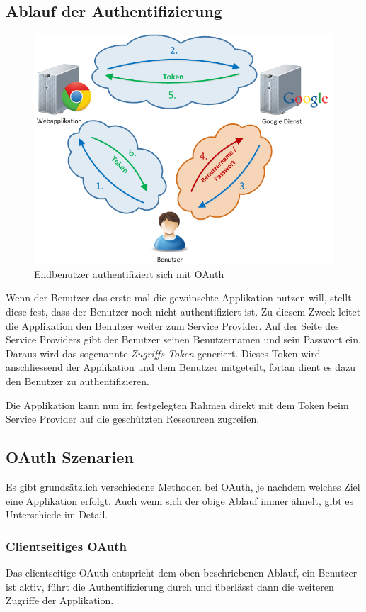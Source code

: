\subsection{Ablauf der Authentifizierung}
\begin{figure}[!ht]
	\centering
	\includegraphics[width=\textwidth]{images/oauth/oauth-user}
	\caption{Endbenutzer authentifiziert sich mit \gls{OAuth}}
	\label{oauth-user}
\end{figure}
Wenn der Benutzer das erste mal die gewünschte Applikation nutzen will, stellt diese fest, dass der Benutzer noch nicht authentifiziert ist. Zu diesem Zweck leitet die Applikation den Benutzer weiter zum Service Provider. Auf der Seite des Service Providers gibt der Benutzer seinen Benutzernamen und sein Passwort ein. Daraus wird das sogenannte \emph{Zugriffs-Token} generiert. Dieses Token wird anschliessend der Applikation und dem Benutzer mitgeteilt, fortan dient es dazu den Benutzer zu authentifizieren.

Die Applikation kann nun im festgelegten Rahmen direkt mit dem Token beim Service Provider auf die geschützten Ressourcen zugreifen.

\subsection{OAuth Szenarien}
Es gibt grundsätzlich verschiedene Methoden bei \gls{OAuth}, je nachdem welches Ziel eine Applikation erfolgt. Auch wenn sich der obige Ablauf immer ähnelt, gibt es Unterschiede im Detail.

\subsubsection{Clientseitiges OAuth}
Das clientseitige \gls{OAuth} entspricht dem oben beschriebenen Ablauf, ein Benutzer ist aktiv, führt die Authentifizierung durch und überlässt dann die weiteren Zugriffe der Applikation.

